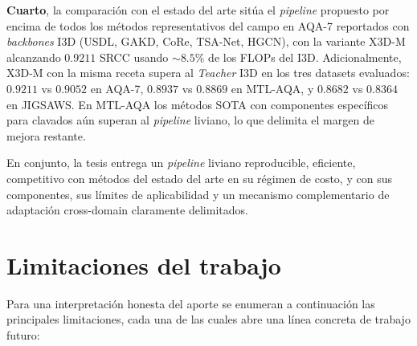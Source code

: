 \textbf{Cuarto}, la comparación con el estado del arte sitúa el \textit{pipeline} propuesto por encima de todos los métodos representativos del campo en AQA-7 reportados con \textit{backbones} \ac{I3D} (USDL, GAKD, CoRe, TSA-Net, HGCN), con la variante X3D-M alcanzando $0.9211$ \ac{SRCC} usando $\sim 8.5\%$ de los \ac{FLOPs} del \ac{I3D}. Adicionalmente, X3D-M con la misma receta supera al \textit{Teacher} \ac{I3D} en los tres datasets evaluados: $0.9211$ vs $0.9052$ en AQA-7, $0.8937$ vs $0.8869$ en MTL-AQA, y $0.8682$ vs $0.8364$ en JIGSAWS. En MTL-AQA los métodos SOTA con componentes específicos para clavados aún superan al \textit{pipeline} liviano, lo que delimita el margen de mejora restante.

En conjunto, la tesis entrega un \textit{pipeline} liviano reproducible, eficiente, competitivo con métodos del estado del arte en su régimen de costo, y con sus componentes, sus límites de aplicabilidad y un mecanismo complementario de adaptación cross-domain claramente delimitados.

\section{Limitaciones del trabajo}

Para una interpretación honesta del aporte se enumeran a continuación las principales limitaciones, cada una de las cuales abre una línea concreta de trabajo futuro:

